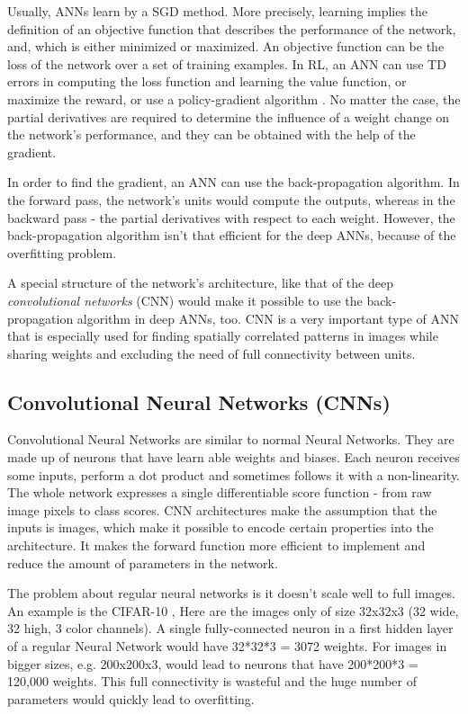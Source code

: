 Usually, ANNs learn by a SGD method. More precisely, learning implies the definition of an objective function that describes the performance of the network, and, which is either minimized or maximized. An objective function can be the loss of the network over a set of training examples. In RL, an ANN can use TD errors in computing the loss function and learning the value function, or maximize the reward, or use a policy-gradient algorithm \cite{Sutton}. No matter the case, the partial derivatives are required to determine the influence of a weight change on the network's performance, and they can be obtained with the help of the gradient.

In order to find the gradient, an ANN can use the back-propagation algorithm. In the forward pass, the network's units would compute the outputs, whereas in the backward pass - the partial derivatives with respect to each weight. However, the back-propagation algorithm isn't that efficient for the deep ANNs, because of the overfitting problem.

A special structure of the network's architecture, like that of the deep \textit{convolutional networks} (CNN) would make it possible to use the back-propagation algorithm in deep ANNs, too. CNN is a very important type of ANN that is especially used for finding spatially correlated patterns in images while sharing weights and excluding the need of full connectivity between units.

\subsection{Convolutional Neural Networks (CNNs)} \label{subsectionCNN}

Convolutional Neural Networks are similar to normal Neural Networks. They are made up of neurons that have learn able weights and biases. Each neuron receives some inputs, perform a dot product and sometimes follows it with a non-linearity. The whole network expresses a single differentiable score function - from raw image pixels to class scores. CNN architectures make the assumption that the inputs is images, which make it possible to encode certain properties into the architecture. It makes the forward function more efficient to implement and reduce the amount of parameters in the network. \cite{CNN_course}      

The problem about regular neural networks is it doesn't scale well to full images. An example is the CIFAR-10 \cite{CIFAR_10}, Here are the images only of size 32x32x3 (32 wide, 32 high, 3 color channels). A single fully-connected neuron in a first hidden layer of a regular Neural Network would have 32*32*3 = 3072 weights. For images in bigger sizes, e.g. 200x200x3, would lead to neurons that have 200*200*3 = 120,000 weights. This full connectivity is wasteful and the huge number of parameters would quickly lead to overfitting.

